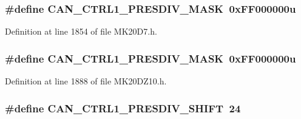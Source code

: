 \subsubsection[{\texorpdfstring{C\+A\+N\+\_\+\+C\+T\+R\+L1\+\_\+\+P\+R\+E\+S\+D\+I\+V\+\_\+\+M\+A\+SK}{CAN_CTRL1_PRESDIV_MASK}}]{\setlength{\rightskip}{0pt plus 5cm}\#define C\+A\+N\+\_\+\+C\+T\+R\+L1\+\_\+\+P\+R\+E\+S\+D\+I\+V\+\_\+\+M\+A\+SK~0x\+F\+F000000u}\hypertarget{group___c_a_n___register___masks_gad8d384c87d48a3fc0b1ae52949823818}{}\label{group___c_a_n___register___masks_gad8d384c87d48a3fc0b1ae52949823818}


Definition at line 1854 of file M\+K20\+D7.\+h.

\subsubsection[{\texorpdfstring{C\+A\+N\+\_\+\+C\+T\+R\+L1\+\_\+\+P\+R\+E\+S\+D\+I\+V\+\_\+\+M\+A\+SK}{CAN_CTRL1_PRESDIV_MASK}}]{\setlength{\rightskip}{0pt plus 5cm}\#define C\+A\+N\+\_\+\+C\+T\+R\+L1\+\_\+\+P\+R\+E\+S\+D\+I\+V\+\_\+\+M\+A\+SK~0x\+F\+F000000u}\hypertarget{group___c_a_n___register___masks_gad8d384c87d48a3fc0b1ae52949823818}{}\label{group___c_a_n___register___masks_gad8d384c87d48a3fc0b1ae52949823818}


Definition at line 1888 of file M\+K20\+D\+Z10.\+h.

\subsubsection[{\texorpdfstring{C\+A\+N\+\_\+\+C\+T\+R\+L1\+\_\+\+P\+R\+E\+S\+D\+I\+V\+\_\+\+S\+H\+I\+FT}{CAN_CTRL1_PRESDIV_SHIFT}}]{\setlength{\rightskip}{0pt plus 5cm}\#define C\+A\+N\+\_\+\+C\+T\+R\+L1\+\_\+\+P\+R\+E\+S\+D\+I\+V\+\_\+\+S\+H\+I\+FT~24}\hypertarget{group___c_a_n___register___masks_ga762ed1bd89d4db4a6f34a12f8ae0afcf}{}\label{group___c_a_n___register___masks_ga762ed1bd89d4db4a6f34a12f8ae0afcf}



